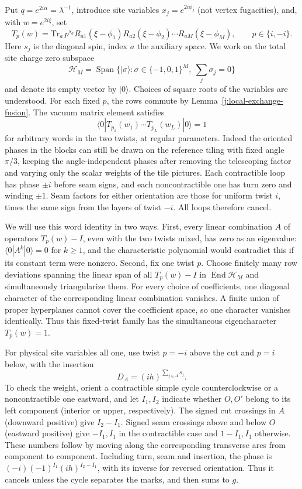 Put $q=e^{2i\alpha}=\lambda^{-1}$, introduce site variables $x_j=e^{2i\phi_j}$ (not vertex fugacities), and, with $w=e^{2i\xi}$, set
\[
T_p(w)=\mathrm{Tr}_a\, p^{s_a} R_{a1}(\xi-\phi_1)R_{a2}(\xi-\phi_2)\cdots R_{aM}(\xi-\phi_M),
 \qquad p\in\{i,-i\}.
\]
Here $s_j$ is the diagonal spin, index $a$ the auxiliary space. We work
on the total site charge zero subspace
\[
\mathcal H_M=\operatorname{Span}\{|\sigma\rangle:
\sigma\in\{-1,0,1\}^M,\ \sum_j\sigma_j=0\}
\]
and denote its empty vector by $|0\rangle$. Choices of square roots of
the variables are understood. For each fixed $p$, the rows commute by
Lemma~\ref{j:local-exchange-fusion}. The vacuum matrix element satisfies
\[
\langle0|T_{p_1}(w_1)\cdots T_{p_L}(w_L)|0\rangle=1
\]
for arbitrary words in the two twists, at regular parameters. Indeed the
oriented phases in the blocks can still be drawn on the reference tiling
with fixed angle $\pi/3$, keeping the angle-independent phases after
removing the telescoping factor and varying only the scalar weights of
the tile pictures. Each contractible loop has phase $\pm i$ before seam
signs, and each noncontractible one has turn zero and winding $\pm1$.
Seam factors for either orientation are those for uniform twist $i$,
times the same sign from the layers of twist $-i$. All loops therefore
cancel.

We will use this word identity in two ways. First, every linear
combination $A$ of operators $T_p(w)-I$, even with the two twists mixed,
has zero as an eigenvalue: $\langle0|A^k|0\rangle=0$ for $k\ge1$, and
the characteristic polynomial would contradict this if its constant
term were nonzero. Second, fix one twist $p$. Choose finitely many row
deviations spanning the linear span of all $T_p(w)-I$ in
$\operatorname{End}\mathcal H_M$ and simultaneously triangularize them. For every
choice of coefficients, one diagonal character of the corresponding
linear combination vanishes. A finite union of proper hyperplanes
cannot cover the coefficient space, so one character vanishes
identically. Thus this fixed-twist family has the simultaneous
eigencharacter $T_p(w)=1$.

For physical site variables all one, use twist $p=-i$ above the cut and $p=i$ below, with the insertion
\[
D_A=(ih)^{\sum_{j\in A}s_j}.
\]
To check the weight, orient a contractible simple cycle counterclockwise or a noncontractible one eastward, and let $I_1,I_2$ indicate whether $O,O'$ belong to its left component (interior or upper, respectively). The signed cut crossings in $A$ (downward positive) give $I_2-I_1$. Signed seam crossings above and below $O$ (eastward positive) give $-I_1,I_1$ in the contractible case and $1-I_1,I_1$ otherwise. These numbers follow by moving along the corresponding transverse arcs from component to component. Including turn, seam and insertion, the phase is $(-i)(-1)^{I_1}(ih)^{I_2-I_1}$, with its inverse for reversed orientation. Thus it cancels unless the cycle separates the marks, and then sums to $g$.

